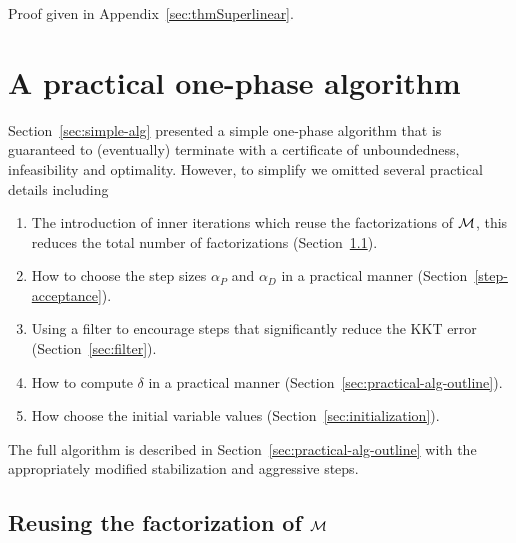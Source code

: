 \documentclass{article}
\begin{document}
Proof given in Appendix~\ref{sec:thmSuperlinear}.

\fi

\section{A practical one-phase algorithm}\label{sec:practical-alg}

Section~\ref{sec:simple-alg} presented a simple one-phase algorithm that is guaranteed to (eventually) terminate with a certificate of unboundedness, infeasibility and optimality. However, to simplify we omitted several practical details including
\begin{enumerate}
\item The introduction of inner iterations which reuse the factorizations of $\mathcal{M}$, this reduces the total number of factorizations (Section~\ref{schur-reuse}).
\item How to choose the step sizes $\alpha_{P}$ and $\alpha_{D}$ in a practical manner (Section~\ref{step-acceptance}).
\item Using a filter to encourage steps that significantly reduce the KKT error (Section~\ref{sec:filter}).
\item How to compute $\delta$ in a practical manner (Section~\ref{sec:practical-alg-outline}).
\item How choose the initial variable values (Section~\ref{sec:initialization}).
\end{enumerate}

The full algorithm is described in Section~\ref{sec:practical-alg-outline} with the appropriately modified stabilization and aggressive steps. 

\subsection{Reusing the factorization of $\mathcal{M}$}\label{schur-reuse}
\end{document}
